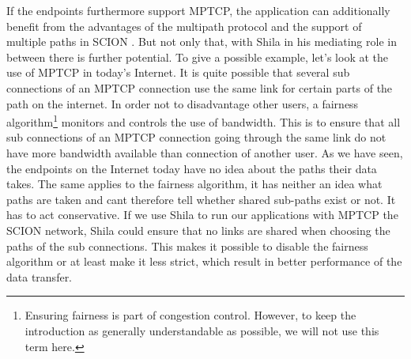 If the endpoints furthermore support MPTCP, the application can additionally benefit from the advantages of the multipath protocol and the support of multiple paths in SCION . But not only that, with Shila in his mediating role in between there is further potential. To give a possible example, let's look at the use of MPTCP in today's Internet. It is quite possible that several sub connections of an MPTCP connection use the same link for certain parts of the path on the internet. In order not to disadvantage other users, a fairness algorithm\footnote{Ensuring fairness is part of congestion control. However, to keep the introduction as generally understandable as possible, we will not use this term here.} monitors and controls the use of bandwidth. This is to ensure that all sub connections of an MPTCP connection going through the same link do not have more bandwidth available than connection of another user. As we have seen, the endpoints on the Internet today have no idea about the paths their data takes. The same applies to the fairness algorithm, it has neither an idea what paths are taken  and cant therefore tell whether shared sub-paths exist or not. It has to act conservative. If we use Shila to run our applications with MPTCP the SCION network, Shila could ensure that no links are shared when choosing the paths of the sub connections. This makes it possible to disable the fairness algorithm or at least make it less strict, which result in better performance of the data transfer.